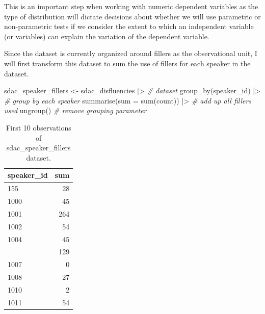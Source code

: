 \documentclass[
  letterpaper,
]{scrbook}
\newenvironment{Shaded}{\begin{snugshade}}{\end{snugshade}}
\newcommand{\AttributeTok}[1]{\textcolor[rgb]{0.00,0.00,0.00}{#1}}
\newcommand{\CommentTok}[1]{\textcolor[rgb]{0.00,0.00,0.00}{\textit{#1}}}
\newcommand{\FunctionTok}[1]{\textcolor[rgb]{0.00,0.00,0.00}{#1}}
\newcommand{\NormalTok}[1]{\textcolor[rgb]{0.00,0.00,0.00}{#1}}
\newcommand{\OtherTok}[1]{\textcolor[rgb]{0.00,0.00,0.00}{#1}}
\newcommand{\SpecialCharTok}[1]{\textcolor[rgb]{0.00,0.00,0.00}{#1}}
\begin{document}
\begin{tcolorbox}[enhanced jigsaw, title=\textcolor{quarto-callout-warning-color}{\faExclamationTriangle}\hspace{0.5em}{Tip}, titlerule=0mm, toptitle=1mm, colbacktitle=quarto-callout-warning-color!10!white, bottomtitle=1mm, left=2mm, colframe=quarto-callout-warning-color-frame, breakable, toprule=.15mm, colback=white, opacitybacktitle=0.6, leftrule=.75mm, rightrule=.15mm, bottomrule=.15mm, arc=.35mm, coltitle=black, opacityback=0]

This is an important step when working with numeric dependent variables
as the type of distribution will dictate decisions about whether we will
use parametric or non-parametric tests if we consider the extent to
which an independent variable (or variables) can explain the variation
of the dependent variable.

\end{tcolorbox}

Since the dataset is currently organized around fillers as the
observational unit, I will first transform this dataset to sum the use
of fillers for each speaker in the dataset.

\begin{Shaded}
\begin{Highlighting}[]
\NormalTok{sdac\_speaker\_fillers }\OtherTok{\textless{}{-}} 
\NormalTok{  sdac\_disfluencies }\SpecialCharTok{|\textgreater{}} \CommentTok{\# dataset}
  \FunctionTok{group\_by}\NormalTok{(speaker\_id) }\SpecialCharTok{|\textgreater{}} \CommentTok{\# group by each speaker}
  \FunctionTok{summarise}\NormalTok{(}\AttributeTok{sum =} \FunctionTok{sum}\NormalTok{(count)) }\SpecialCharTok{|\textgreater{}} \CommentTok{\# add up all fillers used}
  \FunctionTok{ungroup}\NormalTok{() }\CommentTok{\# remove grouping parameter}
\end{Highlighting}
\end{Shaded}

\hypertarget{tbl-i-uni-cont-sdac-transform-preview}{}
\begin{table}
\caption{\label{tbl-i-uni-cont-sdac-transform-preview}First 10 observations of sdac\_speaker\_fillers dataset. }\tabularnewline

\centering
\begin{tabular}{lr}
\toprule
speaker\_id & sum\\
\midrule
155 & 28\\
1000 & 45\\
1001 & 264\\
1002 & 54\\
1004 & 45\\
\addlinespace
1005 & 129\\
1007 & 0\\
1008 & 27\\
1010 & 2\\
1011 & 54\\
\bottomrule
\end{tabular}
\end{table}
\end{document}

